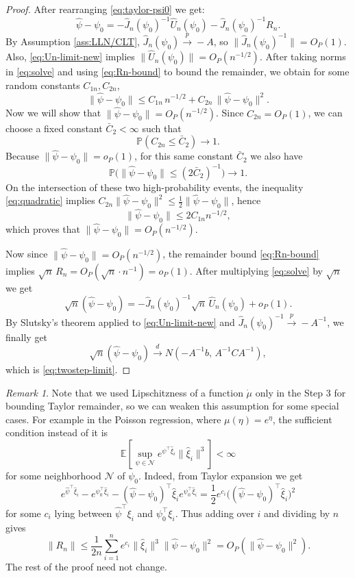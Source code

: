 \documentclass[11pt]{article}
\theoremstyle{definition}
\theoremstyle{remark}
\newtheorem{remark}{Remark}
\newcommand{\E}{\mathbb{E}}
\newcommand{\Pp}{\mathbb{P}}
\newcommand{\toP}{\xrightarrow{\,p\,}}
\newcommand{\tod}{\xrightarrow{\,d\,}}
\begin{document}
\begin{proof}
After rearranging \eqref{eq:taylor-psi0} we get:
\begin{equation}
\hat\psi-\psi_0=-\hat J_n(\psi_0)^{-1}\hat U_n(\psi_0)-\hat J_n(\psi_0)^{-1}R_n.
\label{eq:solve}
\end{equation}
By Assumption \ref{ass:LLN/CLT}, $\hat J_n(\psi_0)\toP -A$, so $\|\hat J_n(\psi_0)^{-1}\|=O_P(1)$.
Also, \eqref{eq:Un-limit-new} implies $\|\hat U_n(\psi_0)\|=O_P(n^{-1/2})$.
After taking norms in \eqref{eq:solve} and using \eqref{eq:Rn-bound} to bound the remainder, we obtain for some random constants $C_{1n},C_{2n}$,
\begin{equation}
\|\hat\psi-\psi_0\|\le C_{1n}\,n^{-1/2}+C_{2n}\,\|\hat\psi-\psi_0\|^2.\label{eq:quadratic}
\end{equation}
Now we will show that $\|\hat\psi-\psi_0\|=O_P(n^{-1/2})$. Since $C_{2n}=O_P(1)$, we can choose a fixed constant $\bar C_2<\infty$ such that
\begin{equation}
\Pp(C_{2n}\le \bar C_2)\to 1.
\label{eq:C2bar}
\end{equation}
Because $\|\hat\psi-\psi_0\|=o_P(1)$, for this same constant $\bar C_2$ we also have
\begin{equation}
\Pp\big(\|\hat\psi-\psi_0\|\le (2\bar C_2)^{-1}\big)\to 1.
\label{eq:smallball}
\end{equation}
On the intersection of these two high-probability events,
the inequality \eqref{eq:quadratic}
implies $C_{2n}\|\hat\psi-\psi_0\|^2\le \frac12\|\hat\psi-\psi_0\|$, hence
\[
\|\hat\psi-\psi_0\|\le 2C_{1n}n^{-1/2},
\]
which proves that $\|\hat\psi-\psi_0\|=O_P(n^{-1/2})$.

Now since $\|\hat\psi-\psi_0\|=O_P(n^{-1/2})$, the remainder bound \eqref{eq:Rn-bound} implies
$\sqrt{n}\,R_n=O_P(\sqrt{n}\cdot n^{-1})=o_P(1)$.
After multiplying \eqref{eq:solve} by $\sqrt{n}$ we get
\[
\sqrt{n}(\hat\psi-\psi_0)=-\hat J_n(\psi_0)^{-1}\sqrt{n}\,\hat U_n(\psi_0)+o_P(1).
\]
By Slutsky's theorem applied to \eqref{eq:Un-limit-new} and $\hat J_n(\psi_0)^{-1}\toP -A^{-1}$, we finally get
\[
\sqrt{n}(\hat\psi-\psi_0)\tod N(-A^{-1}b,\,A^{-1}CA^{-1}),
\]
which is \eqref{eq:twostep-limit}.
\end{proof}
\begin{remark}\label{rem:poisson}
    Note that we used Lipschitzness of a function $\dot\mu$ only in the Step 3 for bounding Taylor remainder, so we can weaken this assumption for some special cases. For example in the Poisson regression, where $\mu(\eta) = e^\eta$, the sufficient condition instead of it is
    \[ \E \left[\sup_{\psi\in \mathcal N} e^{\psi^\top \hat\xi_i}\|\hat\xi_i\|^3 \right]<\infty \]
    for some neighborhood $\mathcal N$ of $\psi_0$. Indeed, from Taylor expansion we get
    \[ e^{\hat\psi^\top \hat\xi_i}-e^{\psi_0^\top \hat\xi_i}-(\hat\psi-\psi_0)^\top\hat\xi_ie^{\psi_0^\top\hat\xi_i} = \frac{1}{2}e^{c_i}\big((\hat\psi-\psi_0)^\top\hat\xi_i\big)^2\]
    for some $c_i$ lying between $\hat\psi^\top\xi_i$ and $\psi_0^\top\xi_i$. Thus adding over $i$ and dividing by $n$ gives
    \[ \|R_n\| \leq \frac{1}{2n}\sum_{i=1}^ne^{c_i}\|\hat\xi_i\|^3 \|\hat\psi - \psi_0\|^2 = O_P(\| \hat\psi-\psi_0 \|^2). \]
    The rest of the proof need not change.
\end{remark}
\end{document}
